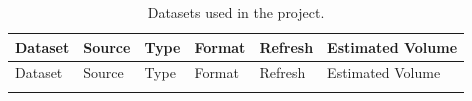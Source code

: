 \documentclass[
]{article}
\begin{document}
\begin{longtable}[]{@{}
  >{\raggedright\arraybackslash}p{}
  >{\raggedright\arraybackslash}p{}
  >{\raggedright\arraybackslash}p{}
  >{\raggedright\arraybackslash}p{}
  >{\raggedright\arraybackslash}p{}
  >{\raggedright\arraybackslash}p{}@{}}
\toprule\noalign{}
\begin{minipage}[b]{\linewidth}\raggedright
Dataset
\end{minipage} & \begin{minipage}[b]{\linewidth}\raggedright
Source
\end{minipage} & \begin{minipage}[b]{\linewidth}\raggedright
Type
\end{minipage} & \begin{minipage}[b]{\linewidth}\raggedright
Format
\end{minipage} & \begin{minipage}[b]{\linewidth}\raggedright
Refresh
\end{minipage} & \begin{minipage}[b]{\linewidth}\raggedright
Estimated Volume
\end{minipage} \\
\midrule\noalign{}
\endfirsthead
\toprule\noalign{}
\begin{minipage}[b]{\linewidth}\raggedright
Dataset
\end{minipage} & \begin{minipage}[b]{\linewidth}\raggedright
Source
\end{minipage} & \begin{minipage}[b]{\linewidth}\raggedright
Type
\end{minipage} & \begin{minipage}[b]{\linewidth}\raggedright
Format
\end{minipage} & \begin{minipage}[b]{\linewidth}\raggedright
Refresh
\end{minipage} & \begin{minipage}[b]{\linewidth}\raggedright
Estimated Volume
\end{minipage} \\
\midrule\noalign{}
\endhead
\bottomrule\noalign{}
\caption{Datasets used in the project.}\label{tbl-datasets}\tabularnewline

\end{longtable}
\end{document}
